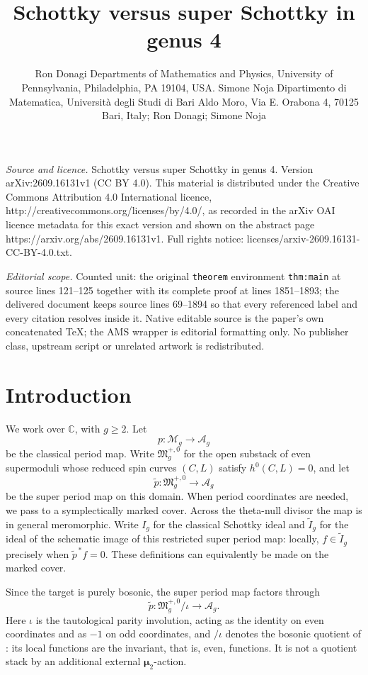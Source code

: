 \documentclass[10pt,a4paper]{amsart}
\newcommand{\MM}{\mathcal M}
\newcommand{\FM}{\mathfrak M}
\newcommand{\Aa}{\mathcal A}
\begin{document}
\title[Schottky versus super Schottky in genus 4]{Schottky versus super Schottky in genus 4}
\author{Ron Donagi Departments of Mathematics and Physics, University of Pennsylvania, Philadelphia, PA 19104, USA. Simone Noja Dipartimento di Matematica, Università degli Studi di Bari Aldo Moro, Via E. Orabona 4, 70125 Bari, Italy; Ron Donagi; Simone Noja}
\date{}
\maketitle
\noindent\emph{Source and licence.} Schottky versus super Schottky in genus 4. Version arXiv:2609.16131v1 (CC BY 4.0). This material is distributed under the Creative Commons Attribution 4.0 International licence, http://creativecommons.org/licenses/by/4.0/, as recorded in the arXiv OAI licence metadata for this exact version and shown on the abstract page https://arxiv.org/abs/2609.16131v1. Full rights notice: licenses/arxiv-2609.16131-CC-BY-4.0.txt.\par\smallskip
\noindent\textit{Editorial scope.} Counted unit: the original \texttt{theorem} environment \texttt{thm:main} at source lines 121--125 together with its complete proof at lines 1851--1893; the delivered document keeps source lines 69--1894 so that every referenced label and every citation resolves inside it. Native editable source is the paper's own concatenated TeX; the AMS wrapper is editorial formatting only. No publisher class, upstream script or unrelated artwork is redistributed.
\section{Introduction}


We work over $\mathbb C$, with $g\geq2$. Let
\[
p:\MM_g\to\Aa_g
\]
be the classical period map. Write $\FM_g^{+,0}$ for the open substack
of even supermoduli whose reduced spin curves $(C,L)$ satisfy
$h^0(C,L)=0$, and let
\[
\widetilde p:\FM_g^{+,0}\longrightarrow\Aa_g
\]
be the super period map on this domain. When period coordinates are
needed, we pass to a symplectically marked cover. Across the theta-null
divisor the map is in general meromorphic.
Write $I_g$ for the classical Schottky ideal and $\widetilde I_g$ for
the ideal of the schematic image of this restricted super period map:
locally, $f\in\widetilde I_g$ precisely when $\widetilde p^{\,*}f=0$.
These definitions can equivalently be made on the marked cover.

Since the target is purely bosonic, the super period map factors through
\[
\widetilde p:\FM_g^{+,0}/\iota\longrightarrow\Aa_g.
\]
Here $\iota$ is the tautological parity involution, acting as the identity
on even coordinates and as $-1$ on odd coordinates, and $/\iota$ denotes
the bosonic quotient of \cite{CV}: its local functions are the invariant,
that is, even, functions. It is not a quotient stack by an additional
external $\boldsymbol\mu_2$-action.
\end{document}
